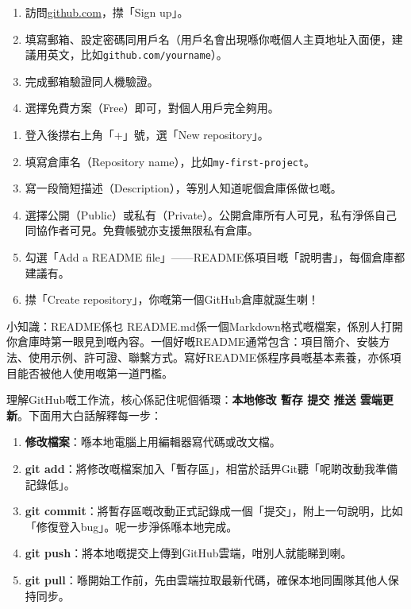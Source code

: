 

\begin{enumerate}
  \item 訪問\href{https://github.com}{github.com}，㩒「Sign up」。
  \item 填寫郵箱、設定密碼同用戶名（用戶名會出現喺你嘅個人主頁地址入面便，建議用英文，比如\texttt{github.\allowbreak com/\allowbreak yourname}）。
  \item 完成郵箱驗證同人機驗證。
  \item 選擇免費方案（Free）即可，對個人用戶完全夠用。
\end{enumerate}


\begin{enumerate}
  \item 登入後㩒右上角「+」號，選「New repository」。
  \item 填寫倉庫名（Repository name），比如\texttt{my-\allowbreak first-\allowbreak project}。
  \item 寫一段簡短描述（Description），等別人知道呢個倉庫係做乜嘅。
  \item 選擇公開（Public）或私有（Private）。公開倉庫所有人可見，私有淨係自己同協作者可見。免費帳號亦支援無限私有倉庫。
  \item 勾選「Add a README file」——README係項目嘅「說明書」，每個倉庫都建議有。
  \item 㩒「Create repository」，你嘅第一個GitHub倉庫就誕生喇！
\end{enumerate}

\begin{tcbinfo}{小知識：README係乜}
README.md係一個Markdown格式嘅檔案，係別人打開你倉庫時第一眼見到嘅內容。一個好嘅README通常包含：項目簡介、安裝方法、使用示例、許可證、聯繫方式。寫好README係程序員嘅基本素養，亦係項目能否被他人使用嘅第一道門檻。

\end{tcbinfo}


理解GitHub嘅工作流，核心係記住呢個循環：\textbf{本地修改 暫存 提交 推送 雲端更新}。下面用大白話解釋每一步：

\begin{enumerate}
  \item \textbf{修改檔案}：喺本地電腦上用編輯器寫代碼或改文檔。
  \item \textbf{git add}：將修改嘅檔案加入「暫存區」，相當於話畀Git聽「呢啲改動我準備記錄低」。
  \item \textbf{git commit}：將暫存區嘅改動正式記錄成一個「提交」，附上一句說明，比如「修復登入bug」。呢一步淨係喺本地完成。
  \item \textbf{git push}：將本地嘅提交上傳到GitHub雲端，咁別人就能睇到喇。
  \item \textbf{git pull}：喺開始工作前，先由雲端拉取最新代碼，確保本地同團隊其他人保持同步。
\end{enumerate}

